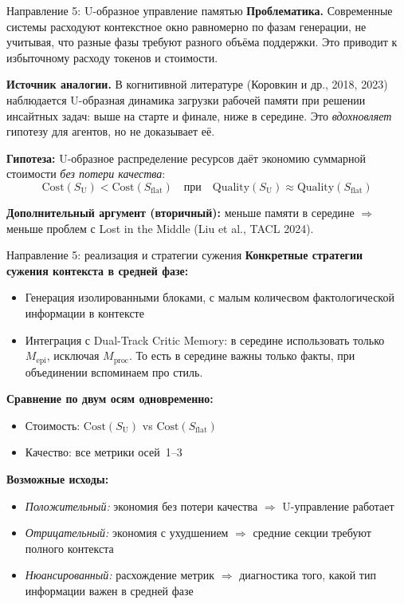 \documentclass[10pt,aspectratio=169]{beamer}
\begin{document}
\begin{frame}{Направление 5: U-образное управление памятью}
  \textbf{Проблематика.} Современные системы расходуют контекстное окно равномерно по фазам генерации, не учитывая, что разные фазы требуют разного объёма поддержки. Это приводит к избыточному расходу токенов и стоимости.

  \textbf{Источник аналогии.} В когнитивной литературе (Коровкин и др., 2018, 2023) наблюдается U-образная динамика загрузки рабочей памяти при решении инсайтных задач: выше на старте и финале, ниже в середине. Это \emph{вдохновляет} гипотезу для агентов, но не доказывает её.

  \textbf{Гипотеза:} U-образное распределение ресурсов даёт экономию суммарной стоимости \emph{без потери качества}:
  \[
    \text{Cost}(S_{\text{U}}) < \text{Cost}(S_{\text{flat}}) \quad \text{при} \quad \text{Quality}(S_{\text{U}}) \approx \text{Quality}(S_{\text{flat}})
  \]

  \vspace{0.3cm}
  \textbf{Дополнительный аргумент (вторичный):} меньше памяти в середине $\Rightarrow$ меньше проблем с Lost in the Middle (Liu et al., TACL 2024).
\end{frame}

\begin{frame}{Направление 5: реализация и стратегии сужения}
  \textbf{Конкретные стратегии сужения контекста в средней фазе:}
  \begin{itemize}
    \item Генерация изолированными блоками, с малым количесвом фактологической информации в контексте
    \item Интеграция с Dual-Track Critic Memory: в середине использовать только $M_{\text{epi}}$, исключая $M_{\text{proc}}$. То есть в середине важны только факты, при объединении вспоминаем про стиль.
  \end{itemize}

  \vspace{0.3cm}
  \textbf{Сравнение по двум осям одновременно:}
  \begin{itemize}
    \item Стоимость: $\text{Cost}(S_{\text{U}})$ vs $\text{Cost}(S_{\text{flat}})$
    \item Качество: все метрики осей~1--3
  \end{itemize}

  \vspace{0.3cm}
  \textbf{Возможные исходы:}
  \begin{itemize}
    \item \emph{Положительный:} экономия без потери качества $\Rightarrow$ U-управление работает
    \item \emph{Отрицательный:} экономия с ухудшением $\Rightarrow$ средние секции требуют полного контекста
    \item \emph{Нюансированный:} расхождение метрик $\Rightarrow$ диагностика того, какой тип информации важен в средней фазе
  \end{itemize}
\end{frame}
\end{document}
